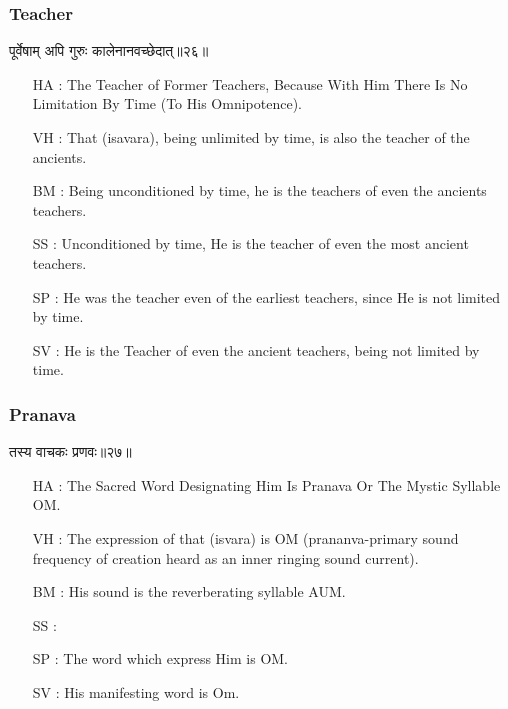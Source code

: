 \begin{frame}[fragile]\frametitle{Teacher}
\begin{sanskrit}
पूर्वेषाम् अपि गुरुः कालेनानवच्छेदात्॥२६॥
\end{sanskrit}

	\begin{itemize}
	\item [HA]: The Teacher of Former Teachers, Because With Him There Is No Limitation By Time (To His Omnipotence).
	\item [VH]: That (isavara), being unlimited by time, is also the teacher of the ancients.
	\item [BM]: Being unconditioned by time, he is the teachers of even the ancients teachers.
	\item [SS]: Unconditioned by time, He is the teacher of even the most ancient teachers.
	\item [SP]: He was the teacher even of the earliest teachers, since He is not limited by time.
	\item [SV]: He is the Teacher of even the ancient teachers, being not limited by time. 
	\end{itemize}
\end{frame}

\begin{frame}[fragile]\frametitle{Pranava}
\begin{sanskrit}
तस्य वाचकः प्रणवः॥२७॥
\end{sanskrit}

	\begin{itemize}
	\item [HA]: The Sacred Word Designating Him Is Pranava Or The Mystic Syllable OM.
	\item [VH]: The expression of that (isvara) is OM (prananva-primary sound frequency of creation heard as an inner ringing sound current).
	\item [BM]: His sound is the reverberating syllable AUM.
	\item [SS]:
	\item [SP]: The word which express Him is OM.
	\item [SV]: His manifesting word is Om. 
	\end{itemize}
\end{frame}


